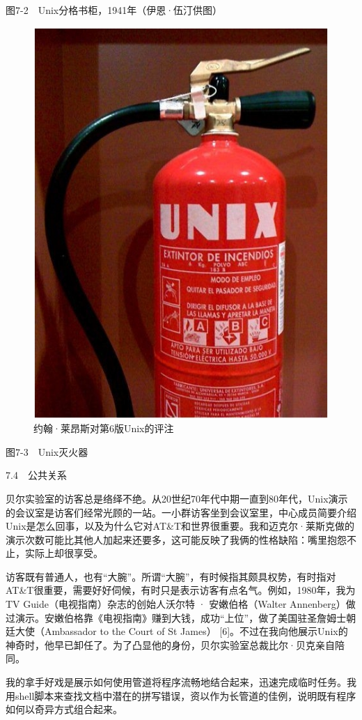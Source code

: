 \documentclass[a4paper,12pt,UTF8,twoside]{ctexbook}
\begin{document}
图7-2　Unix分格书柜，1941年（伊恩·伍汀供图）

\begin{figure}[htbp]
	\centering
	\includegraphics[width=0.7\linewidth]{65}
	\caption{约翰·莱昂斯对第6版Unix的评注}
	\label{fig:1}
\end{figure}

图7-3　Unix灭火器





7.4　公共关系


贝尔实验室的访客总是络绎不绝。从20世纪70年代中期一直到80年代，Unix演示的会议室是访客们经常光顾的一站。一小群访客坐到会议室里，中心成员简要介绍Unix是怎么回事，以及为什么它对AT\&T和世界很重要。我和迈克尔·莱斯克做的演示次数可能比其他人加起来还要多，这可能反映了我俩的性格缺陷：嘴里抱怨不止，实际上却很享受。

访客既有普通人，也有“大腕”。所谓“大腕”，有时候指其颇具权势，有时指对AT\&T很重要，需要好好伺候，有时只是表示访客有点名气。例如，1980年，我为TV Guide（电视指南）杂志的创始人沃尔特 · 安嫩伯格（Walter Annenberg）做过演示。安嫩伯格靠《电视指南》赚到大钱，成功“上位”，做了美国驻圣詹姆士朝廷大使（Ambassador to the Court of St James） [6]。不过在我向他展示Unix的神奇时，他早已卸任了。为了凸显他的身份，贝尔实验室总裁比尔·贝克亲自陪同。

我的拿手好戏是展示如何使用管道将程序流畅地结合起来，迅速完成临时任务。我用shell脚本来查找文档中潜在的拼写错误，资以作为长管道的佳例，说明既有程序如何以奇异方式组合起来。
\end{document}
